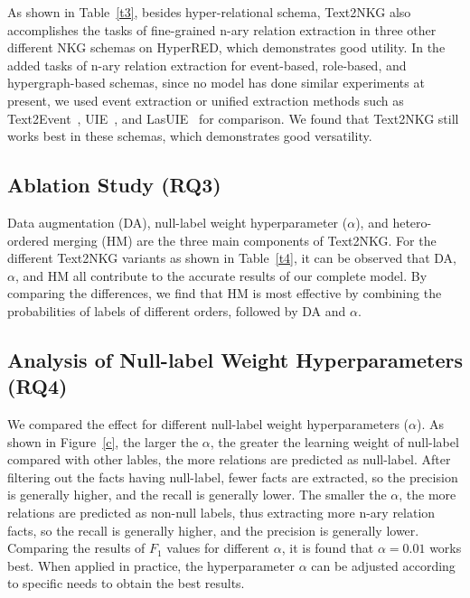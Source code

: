 \documentclass{article} \usepackage{iclr2024_conference,times}
\begin{document}
As shown in Table~\ref{t3}, besides hyper-relational schema, Text2NKG also accomplishes the tasks of fine-grained n-ary relation extraction in three other different NKG schemas on HyperRED, which demonstrates good utility. In the added tasks of n-ary relation extraction for event-based, role-based, and hypergraph-based schemas, since no model has done similar experiments at present, we used event extraction or unified extraction methods such as Text2Event~\citep{Text2Event}, UIE~\citep{UIE}, and LasUIE~\citep{LasUIE} for comparison. We found that Text2NKG still works best in these schemas, which demonstrates good versatility.


\subsection{Ablation Study (RQ3)}

Data augmentation (DA), null-label weight hyperparameter ($\alpha$), and hetero-ordered merging (HM) are the three main components of Text2NKG. For the different Text2NKG variants as shown in Table~\ref{t4}, it can be observed that DA, $\alpha$, and HM all contribute to the accurate results of our complete model. By comparing the differences, we find that HM is most effective by combining the probabilities of labels of different orders, followed by DA and $\alpha$.



\subsection{Analysis of Null-label Weight Hyperparameters (RQ4)}

We compared the effect for different null-label weight hyperparameters ($\alpha$). As shown in Figure~\ref{c}, the larger the $\alpha$, the greater the learning weight of null-label compared with other lables, the more relations are predicted as null-label. After filtering out the facts having null-label, fewer facts are extracted, so the precision is generally higher, and the recall is generally lower. The smaller the $\alpha$, the more relations are predicted as non-null labels, thus extracting more n-ary relation facts, so the recall is generally higher, and the precision is generally lower. Comparing the results of $F_1$ values for different $\alpha$, it is found that $\alpha=0.01$ works best. When applied in practice, the hyperparameter $\alpha$ can be adjusted according to specific needs to obtain the best results. 
\end{document}
